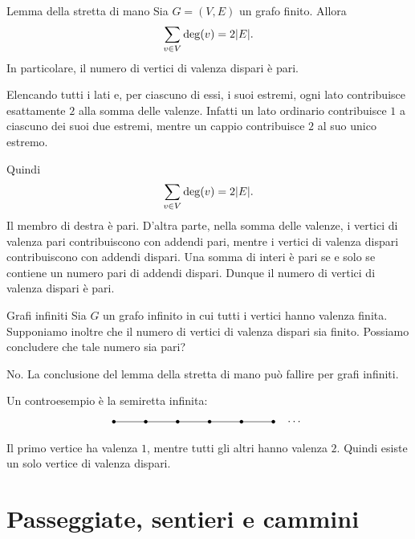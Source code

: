 \documentclass[a4paper]{article}
\begin{document}
\begin{snippetproposition}{Lemma della stretta di mano}
    Sia \(G=(V,E)\) un grafo finito. Allora
    \[
        \sum_{v\in V}\deg(v)=2|E|.
    \]
    In particolare, il numero di vertici di valenza dispari è pari.
\end{snippetproposition}

\begin{snippetproof}{}
    Elencando tutti i lati e, per ciascuno di essi, i suoi estremi, ogni lato contribuisce esattamente \(2\) alla somma delle valenze. Infatti un lato ordinario contribuisce \(1\) a ciascuno dei suoi due estremi, mentre un cappio contribuisce \(2\) al suo unico estremo.

    Quindi
    \[
        \sum_{v\in V}\deg(v)=2|E|.
    \]
    Il membro di destra è pari. D'altra parte, nella somma delle valenze, i vertici di valenza pari contribuiscono con addendi pari, mentre i vertici di valenza dispari contribuiscono con addendi dispari. Una somma di interi è pari se e solo se contiene un numero pari di addendi dispari. Dunque il numero di vertici di valenza dispari è pari.
\end{snippetproof}

\begin{snippetexercise}{Grafi infiniti}
    Sia \(G\) un grafo infinito in cui tutti i vertici hanno valenza finita. Supponiamo inoltre che il numero di vertici di valenza dispari sia finito. Possiamo concludere che tale numero sia pari?
\end{snippetexercise}

\begin{snippetsolution}{}
    No. La conclusione del lemma della stretta di mano può fallire per grafi infiniti.

    Un controesempio è la semiretta infinita:
    \[
        \begin{tikzpicture}[scale=1]
            \foreach \x in {0,1,2,3,4,5}{
                \fill (\x,0) circle (1.6pt);
            }
            \foreach \x in {0,1,2,3,4}{
                \draw (\x,0)--(\x+1,0);
            }
            \node at (5.65,0) {\(\cdots\)};
        \end{tikzpicture}
    \]
    Il primo vertice ha valenza \(1\), mentre tutti gli altri hanno valenza \(2\). Quindi esiste un solo vertice di valenza dispari.
\end{snippetsolution}

\section{Passeggiate, sentieri e cammini}
\end{document}
